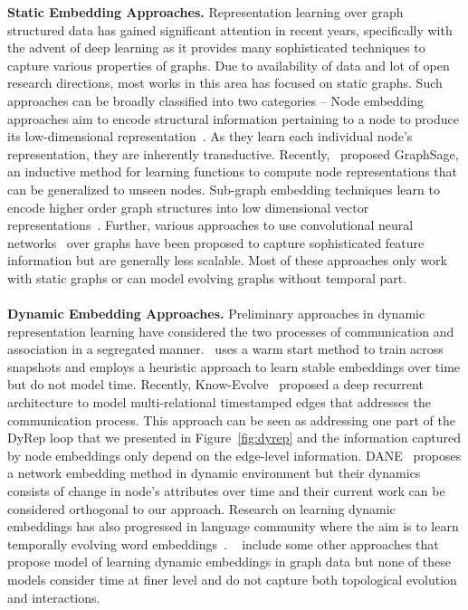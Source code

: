 \documentclass[11pt]{article}
\begin{document}
\textbf{Static Embedding Approaches.}
Representation learning over graph structured data has gained significant attention in recent years, specifically with the advent of deep learning as it provides many sophisticated techniques to capture various properties of graphs. Due to availability of data and lot of open research directions, most works in this area has focused on static graphs. Such approaches can be broadly classified into two categories -- Node embedding approaches aim to encode structural information pertaining to a node to produce its low-dimensional representation~\cite{CaoLuXu15,GroLes16,PerAlSki14,TanQuWanZhaetal15,WanCuiZhu16,WanCuiWanPeiZhuYan17,XuWeiCaoYu17}. As they learn each individual node's representation, they are inherently transductive. Recently,~\cite{HamYinLes17}  proposed GraphSage, an inductive method for learning functions to compute node representations that can be generalized to unseen nodes. Sub-graph embedding techniques learn to encode higher order graph structures into low dimensional vector representations~\cite{ScaGorTsoHagetal09, LiTarBroZem15, DaiDaiSon16}. Further, various approaches to use convolutional neural networks~\cite{KipWel16, KipWel16b, BruZarSzlLeC13} over graphs have been proposed to capture sophisticated feature information but are generally less scalable. Most of these approaches only work with static graphs or can model evolving graphs without temporal part.\\\\
\textbf{Dynamic Embedding Approaches.}
Preliminary approaches in dynamic representation learning have considered the two processes of communication and association in a segregated manner.~\cite{GoyKamHeLiu17} uses a warm start method to train across snapshots and employs a heuristic approach to learn stable embeddings over time but do not model time. Recently, Know-Evolve~\cite{TriDaiWanSon17} proposed a deep recurrent architecture to model multi-relational timestamped edges that addresses the communication process. This approach can be seen as addressing one part of the DyRep loop that we presented in Figure~\ref{fig:dyrep} and the information captured by node embeddings only depend on the edge-level information. DANE~\cite{LiDanHuTanChaLiu17} proposes a network embedding method in dynamic environment but their dynamics consists of change in node's attributes over time and their current work can be considered orthogonal to our approach. Research on learning dynamic embeddings has also progressed in language community where the aim is to learn temporally evolving word embeddings~\cite{BamMan17, RudBle18}. ~\cite{YanLiuWanLiuHan17, SarSidGor07} include some other approaches that propose model of learning dynamic embeddings in graph data but none of these models consider time at finer level and do not capture both topological evolution and interactions.\\\\
\end{document}
